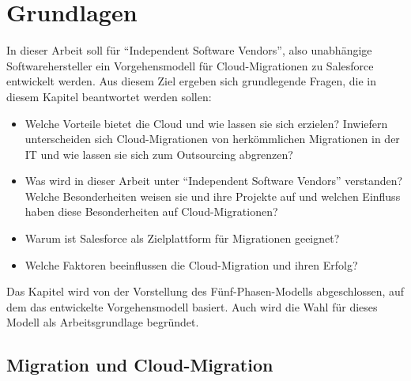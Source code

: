 \section{Grundlagen}
\label{cha:grundlagen}



In dieser Arbeit soll für "`Independent Software Vendors"', also unabhängige
Softwarehersteller ein Vorgehensmodell für Cloud-Migrationen zu Salesforce
entwickelt werden. Aus diesem Ziel ergeben sich grundlegende Fragen, die in
diesem Kapitel beantwortet werden sollen:
\begin{itemize}
	\item Welche Vorteile bietet die Cloud und wie lassen sie sich
erzielen? Inwiefern unterscheiden sich Cloud-Migrationen von herkömmlichen
Migrationen in der IT und wie lassen sie sich zum Outsourcing abgrenzen? 
	\item Was wird in dieser Arbeit unter "`Independent Software Vendors"'
verstanden? Welche Besonderheiten weisen sie und ihre Projekte auf und welchen
Einfluss haben diese Besonderheiten auf Cloud-Migrationen?
	\item Warum ist Salesforce als Zielplattform für Migrationen
geeignet?
	\item Welche Faktoren beeinflussen die Cloud-Migration und ihren
Erfolg?
\end{itemize}
Das Kapitel wird von der Vorstellung des Fünf-Phasen-Modells abgeschlossen,
auf dem das entwickelte Vorgehensmodell basiert. Auch wird die Wahl für dieses
Modell als Arbeitsgrundlage begründet.

\subsection{Migration und Cloud-Migration}
\label{cha:definition_cloud-migration}

